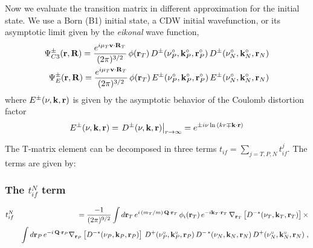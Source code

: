 Now we evaluate the transition matrix in different approximation for
the initial state. We use a Born (B1) initial state, a CDW initial
wavefunction, or its asymptotic limit given by the \emph{eikonal} wave
function,
\begin{eqnarray} \label{Q:wf-i}
\Psi^{\pm}_{C3} (\mathbf{r},\mathbf{R}) = \frac{e^{i \mu_{T} \mathbf{v} \cdot
\mathbf{R}_T}} {(2 \pi)^{3/2}} \, \phi(\mathbf{r}_T) \,
D^{\pm}(\nu^{\circ}_P,\mathbf{k}_{P}^{\circ},\mathbf{r}_{P}^{\circ})
\,D^{\pm}(\nu_{N}^{\circ},\mathbf{k}_{N}^{\circ},\mathbf{r}_N)  \\
\Psi^{\pm}_{E} (\mathbf{r},\mathbf{R}) = \frac{e^{i \mu_{T} \mathbf{v} \cdot
\mathbf{R}_T}} {(2 \pi)^{3/2}} \, \phi(\mathbf{r}_T) \,
E^{\pm}(\nu^{\circ}_P,\mathbf{k}_{P}^{\circ},\mathbf{r}_{P}^{\circ})
\,E^{\pm}(\nu_{N}^{\circ},\mathbf{k}_{N}^{\circ},\mathbf{r}_N)
\end{eqnarray}
%
where $E^{\pm}(\nu,\mathbf{k},\mathbf{r})$ is given by the asymptotic behavior of
the Coulomb distortion factor
\begin{equation} \label{Q:Eikonal-wf}
E^{\pm}(\nu,\vect{k},\vect{r}) = \left. D^{\pm}(\nu,\vect{k},\vect{r}) \vstretch
\right|_{r \to \infty} = e^{{\pm} i \nu \ln{\left( kr \mp \vect{k}\cdot
\vect{r} \right)}}
\end{equation}


The T-matrix element can be decomposed in three terms $t_{if}=
\sum_{j=T,P,N} t^{j}_{if}$. The terms are given by:

\subsubsection{The $t^{N}_{if}$ term}
%
\begin{eqnarray} \label{Q:tifN1}
&t^{N}_{if}&\!\!= \frac{-1}{(2 \pi)^{9/2}}  \int d \mathbf{r}_{T} \,
  e^{i \, (m_{T}/m) \, \mathbf{Q} \cdot \mathbf{r}_T}
\, \phi_{i}(\mathbf{r}_T) \, e^{-i \mathbf{k}_{T} \cdot \mathbf{r}_T}
\,\nabla_{\mathbf{r}_{T}}\left[ D^{-*}(\nu_{T},\mathbf{k}_{T},\mathbf{r}_T) \right]
{\times}
\\
&& \int d \mathbf{r}_{P} \,
   e^{- i \, \mathbf{Q} \cdot \mathbf{r}_{P}}
\nabla_{\mathbf{r}_{P}}\left[ D^{-*}(\nu_{P},\mathbf{k}_{P},\mathbf{r}_{P}) \right]
\, D^{+}(\nu_{P}^{\circ},\mathbf{k}_{P}^{\circ},\mathbf{r}_{P}) \, D^{-\,\ast}(\nu_{N},
\mathbf{k}_{N}, \mathbf{r}_{N} ) \, D^{+}(\nu_{N}^{\circ},\mathbf{k}_{N}^{\circ},\mathbf{r}_{N})\;
,\nonumber
\end{eqnarray}

